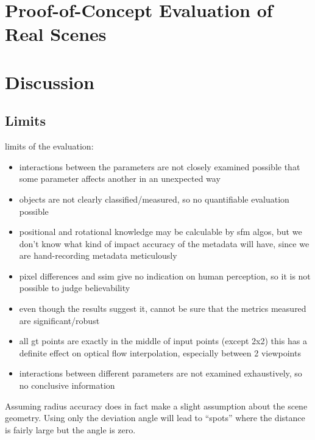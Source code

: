 \section{Proof-of-Concept Evaluation of Real Scenes}

\section{Discussion}

\subsection{Limits}

limits of the evaluation:
\begin{itemize}
  \item interactions between the parameters are not closely examined \ar possible that some parameter affects another in an unexpected way
  \item objects are not clearly classified/measured, so no quantifiable evaluation possible
  \item positional and rotational knowledge may be calculable by sfm algos, but we don't know what kind of impact accuracy of the metadata will have, since we are hand-recording metadata meticulously
  \item pixel differences and ssim give no indication on human perception, so it is not possible to judge believability
  \item even though the results suggest it, cannot be sure that the metrics measured are significant/robust
  \item all gt points are exactly in the middle of input points (except 2x2) this has a definite effect on optical flow interpolation, especially between 2 viewpoints
  \item interactions between different parameters are not examined exhaustively, so no conclusive information
\end{itemize}

Assuming radius accuracy does in fact make a slight assumption about the scene geometry. Using only the deviation angle will lead to ``spots'' where the distance is fairly large but the angle is zero. 

